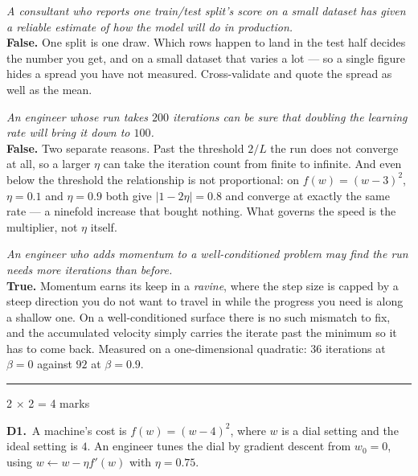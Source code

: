 \documentclass[10pt,a4paper]{article}
\newcommand{\parthead}[2]{\vspace{2pt}\noindent\rule{\linewidth}{0.4pt}\par\vspace{2pt}%
  \noindent{\bfseries Part #1}\hfill{\small #2}\par\vspace{1pt}}
\begin{document}
\begin{sC}

  \item \emph{A consultant who reports one train/test split's score on a small dataset has given a reliable estimate of how the model will do in production.}\\[2pt] \textbf{False.} One split is one draw. Which rows happen to land in the test half decides the number you get, and on a small dataset that varies a lot --- so a single figure hides a spread you have not measured. Cross-validate and quote the spread as well as the mean.

  \item \emph{An engineer whose run takes $200$ iterations can be sure that doubling the learning rate will bring it down to $100$.}\\[2pt] \textbf{False.} Two separate reasons. Past the threshold $2/L$ the run does not converge at all, so a larger $\eta$ can take the iteration count from finite to infinite. And even below the threshold the relationship is not proportional: on $f(w) = (w-3)^2$, $\eta = 0.1$ and $\eta = 0.9$ both give $\lvert 1 - 2\eta \rvert = 0.8$ and converge at exactly the same rate --- a ninefold increase that bought nothing. What governs the speed is the multiplier, not $\eta$ itself.

  \item \emph{An engineer who adds momentum to a well-conditioned problem may find the run needs \emph{more} iterations than before.}\\[2pt] \textbf{True.} Momentum earns its keep in a \emph{ravine}, where the step size is capped by a steep direction you do not want to travel in while the progress you need is along a shallow one. On a well-conditioned surface there is no such mismatch to fix, and the accumulated velocity simply carries the iterate past the minimum so it has to come back. Measured on a one-dimensional quadratic: $36$ iterations at $\beta = 0$ against $92$ at $\beta = 0.9$.

\end{sC}

\newpage

\parthead{D --- Short answer}{2 $\times$ 2 = 4 marks}

\textbf{D1.}\ A machine's cost is $f(w) = (w-4)^2$, where $w$ is a dial setting and the ideal setting is $4$. An engineer tunes the dial by gradient descent from $w_0 = 0$, using $w \leftarrow w - \eta f'(w)$ with $\eta = 0.75$.
\end{document}
